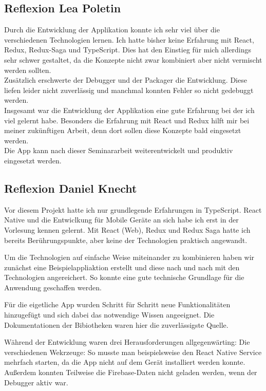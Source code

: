 \subsection{Reflexion Lea Poletin}
Durch die Entwicklung der Applikation konnte ich sehr viel über die verschiedenen Technologien lernen. 
Ich hatte bisher keine Erfahrung mit React, Redux, Redux-Saga und TypeScript. 
Dies hat den Einstieg für mich allerdings sehr schwer gestaltet, da die Konzepte nicht 
zwar kombiniert aber nicht vermischt werden sollten.\\
Zusätzlich erschwerte der Debugger und der Packager die Entwicklung. 
Diese liefen leider nicht zuverlässig und manchmal konnten Fehler so nicht 
gedebuggt werden. \\
Insgesamt war die Entwicklung der Applikation eine gute Erfahrung bei der ich viel gelernt habe. 
Besonders die Erfahrung mit React und Redux hilft mir bei meiner zukünftigen Arbeit, denn dort sollen
diese Konzepte bald eingesetzt werden.\\
Die App kann nach dieser Seminararbeit weiterentwickelt und produktiv eingesetzt werden. 


\subsection{Reflexion Daniel Knecht}
Vor diesem Projekt hatte ich nur grundlegende Erfahrungen in TypeScript.
React Native und die Entwiclkung für Mobile Geräte an sich habe ich erst in der Vorlesung kennen gelernt.
Mit React (Web), Redux und Redux Saga hatte ich bereits Berührungspunkte,
aber keine der Technologien praktisch angewandt.

Um die Technologien auf einfache Weise miteinander zu kombinieren haben wir zunächst eine
Beispielappliaktion erstellt und diese nach und nach mit den Technologien angereichert.
So konnte eine gute technische Grundlage für die Anwendung geschaffen werden.

Für die eigetliche App wurden Schritt für Schritt neue Funktionalitäten hinzugefügt
und sich dabei das notwendige Wissen angeeignet.
Die Dokumentationen der Bibiotheken waren hier die zuverlässigste Quelle.

Während der Entwicklung waren drei Herausforderungen allgegenwärting:
Die verschiedenen Wekrzeuge: So musste man beispielsweise den React Native Service mehrfach starten,
da die App nicht auf dem Gerät installiert werden konnte.
Außerdem konnten Teilweise die Firebase-Daten nicht geladen werden,
wenn der Debugger aktiv war.

